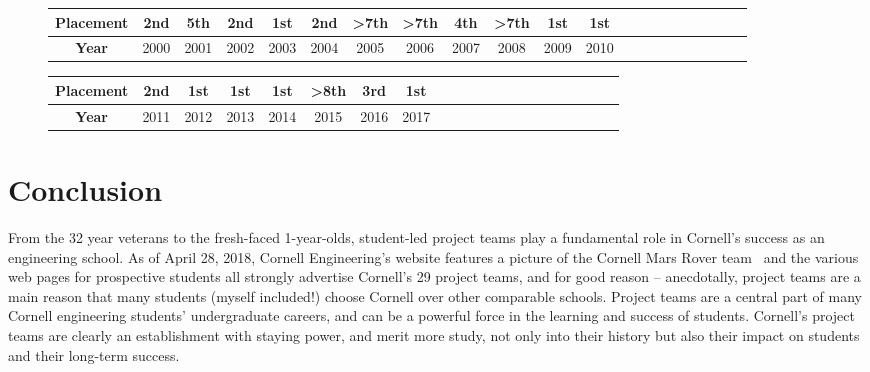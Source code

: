 \documentclass[12pt]{article}
\begin{document}
\begin{figure}
  \centering

  \begin{tabular}{|c||c|c|c|c|c|c|c|c|c|c|c|c|c|c|c|c|c|c|c|c|}
    \hline
    \textbf{Placement} & \cellcolor{gray!50}2nd & 5th & \cellcolor{gray!50}2nd & \cellcolor{Goldenrod}1st & \cellcolor{gray!50}2nd & \textgreater 7th & \textgreater 7th & 4th & \textgreater 7th & \cellcolor{Goldenrod}1st & \cellcolor{Goldenrod}1st \\
    \hline
    \textbf{Year} & 2000 & 2001 & 2002 & 2003 & 2004 & 2005 & 2006 & 2007 & 2008 & 2009 & 2010\\
    \hline
  \end{tabular}
  \vspace{0.3cm}

  \begin{tabular}{|c||c|c|c|c|c|c|c|c|c|c|c|c|c|c|c|c|c|c|c|c|}
    \hline
    \textbf{Placement} & \cellcolor{gray!50}2nd & \cellcolor{Goldenrod}1st & \cellcolor{Goldenrod}1st & \cellcolor{Goldenrod}1st & \textgreater 8th & \cellcolor{RawSienna!75}3rd & \cellcolor{Goldenrod}1st\\
    \hline
    \textbf{Year} & 2011 & 2012 & 2013 & 2014 & 2015 & 2016 & 2017\\
    \hline
  \end{tabular}
  \label{table:cuauv}
\end{figure}

\section{Conclusion}
\label{sec:conclusion}

From the 32 year veterans to the fresh-faced 1-year-olds, student-led project teams play a fundamental role in Cornell's success as an engineering school.
As of April 28, 2018, Cornell Engineering's website features a picture of the Cornell Mars Rover team~\cite{fleischman_rovers_2018} and the various web pages for prospective students all strongly advertise Cornell's 29 project teams, and for good reason -- anecdotally, project teams are a main reason that many students (myself included!) choose Cornell over other comparable schools.
Project teams are a central part of many Cornell engineering students' undergraduate careers, and can be a powerful force in the learning and success of students.
Cornell's project teams are clearly an establishment with staying power, and merit more study, not only into their history but also their impact on students and their long-term success.



\end{document}
